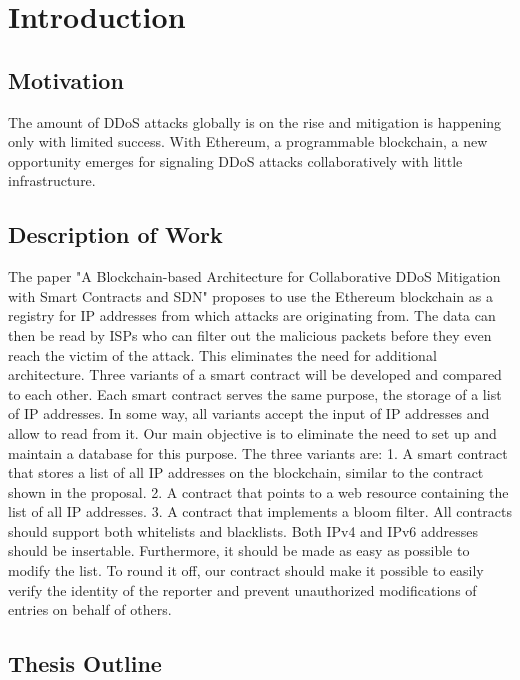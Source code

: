 \chapter{Introduction}

\section{Motivation}

The amount of DDoS attacks globally is on the rise and mitigation is happening only with limited success. With Ethereum, a programmable blockchain, a new opportunity emerges for signaling DDoS attacks collaboratively with little infrastructure. 

\section{Description of Work}

The paper {"}A Blockchain-based Architecture for Collaborative DDoS Mitigation with Smart Contracts and SDN{"} \cite{OriginalPaper} proposes to use the Ethereum blockchain as a registry for IP addresses from which attacks are originating from. The data can then be read by ISPs who can filter out the malicious packets before they even reach the victim of the attack. This eliminates the need for additional architecture.
Three variants of a smart contract will be developed and compared to each other. Each smart contract serves the same purpose, the storage of a list of IP addresses. In some way, all variants accept the input of IP addresses and allow to read from it.
Our main objective is to eliminate the need to set up and maintain a database for this purpose.
The three variants are: 1. A smart contract that stores a list of all IP addresses on the blockchain, similar to the contract shown in the proposal. 2. A contract that points to a web resource containing the list of all IP addresses. 3. A contract that implements a bloom filter.
All contracts should support both whitelists and blacklists. Both IPv4 and IPv6 addresses should be insertable. Furthermore, it should be made as easy as possible to modify the list. To round it off, our contract should make it possible to easily verify the identity of the reporter and prevent unauthorized modifications of entries on behalf of others. 

\section{Thesis Outline}

